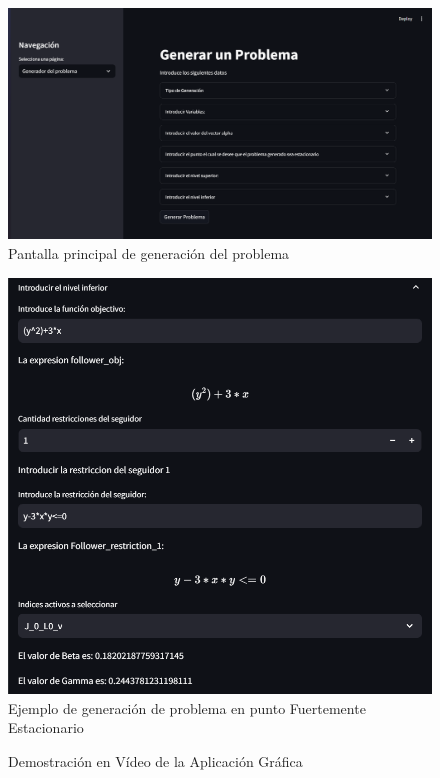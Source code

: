\begin{figure}[H]
    \centering
    \includegraphics[width=\textwidth]{Graphics/front_streamlitpng.png}
    \caption{Pantalla principal de generación del problema}
    \label{fig:front_generator_page}
\end{figure}

\begin{figure}[H]
    \centering
    \includegraphics[width=\textwidth]{Graphics/Ejemplo_introducir_follower_rest.png}
    \caption{Ejemplo de generación de problema en punto Fuertemente Estacionario}
    \label{fig:example_strong_stationary_front_generator}
\end{figure}

\begin{figure}[H]
    \centering
\caption{Demostración en Vídeo de la Aplicación Gráfica}
\end{figure}